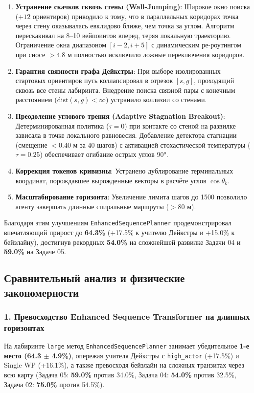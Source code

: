 \begin{enumerate}[leftmargin=*,noitemsep]
    \item \textbf{Устранение скачков сквозь стены (Wall-Jumping)}: Широкое окно поиска ($+12$ ориентиров) приводило к тому, что в параллельных коридорах точка через стену оказывалась евклидово ближе, чем точка за углом. Алгоритм перескакивал на 8--10 вейпоинтов вперед, теряя локальную траекторию. Ограничение окна диапазоном $[i-2, i+5]$ с динамическим ре-роутингом при сносе $> 4.8\text{ м}$ полностью исключило ложные переключения коридоров.
    \item \textbf{Гарантия связности графа Дейкстры}: При выборе изолированных стартовых ориентиров путь коллапсировал в отрезок $[s, g]$, проходящий сквозь все стены лабиринта. Внедрение поиска связной пары с конечным расстоянием ($\text{dist}(s, g) < \infty$) устранило коллизии со стенами.
    \item \textbf{Преодоление углового трения (Adaptive Stagnation Breakout)}: Детерминированная политика ($\tau=0$) при контакте со стеной на развилке зависала в точке локального равновесия. Добавление детектора стагнации (смещение $< 0.40\text{ м}$ за 40 шагов) с активацией стохастической температуры ($\tau=0.25$) обеспечивает огибание острых углов 90°.
    \item \textbf{Коррекция токенов кривизны}: Устранено дублирование терминальных координат, порождавшее вырожденные векторы в расчёте углов $\cos \theta_k$.
    \item \textbf{Масштабирование горизонта}: Увеличение лимита шагов до 1500 позволило агенту завершать длинные спиральные маршруты ($> 80\text{ м}$).
\end{enumerate}

Благодаря этим улучшениям \texttt{EnhancedSequencePlanner} продемонстрировал впечатляющий прирост до \textbf{64.3\%} (+17.5\% к учителю Дейкстры и +15.0\% к бейзлайну), достигнув рекордных \textbf{54.0\%} на сложнейшей развилке Задачи 04 и \textbf{59.0\%} на Задаче 05.

\subsection{Сравнительный анализ и физические закономерности}

\subsubsection{1. Превосходство Enhanced Sequence Transformer на длинных горизонтах}
На лабиринте \texttt{large} метод \texttt{EnhancedSequencePlanner} занимает убедительное \textbf{1-е место (64.3 $\pm$ 4.9\%)}, опережая учителя Дейкстры с \texttt{high\_actor} (+17.5\%) и Single WP (+16.1\%), а также превосходя бейзлайн на сложных транзитах через всю карту (Задача 05: \textbf{59.0\%} против 34.0\%, Задача 04: \textbf{54.0\%} против 32.5\%, Задача 02: \textbf{75.0\%} против 54.5\%).

